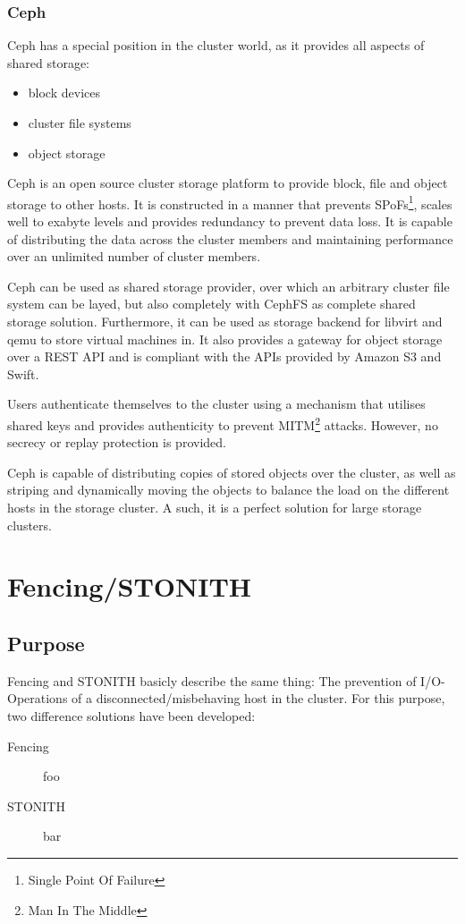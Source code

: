 \subsubsection{Ceph}
Ceph has a special position in the cluster world, as it provides all aspects of shared storage:
\begin{itemize}
\item block devices
\item cluster file systems
\item object storage
\end{itemize}

Ceph is an open source cluster storage platform to provide block, file and object storage to other hosts. It is constructed in a manner that prevents SPoFs\footnote{Single Point Of Failure}, scales well to exabyte levels and provides redundancy to prevent data loss. It is capable of distributing the data across the cluster members and maintaining performance over an unlimited number of cluster members.

Ceph can be used as shared storage provider, over which an arbitrary cluster file system can be layed, but also completely with CephFS as complete shared storage solution. Furthermore, it can be used as storage backend for libvirt and qemu to store virtual machines in. It also provides a gateway for object storage over a REST API and is compliant with the APIs provided by Amazon S3 and Swift.%

Users authenticate themselves to the cluster using a mechanism that utilises shared keys and provides authenticity to prevent MITM\footnote{Man In The Middle} attacks. However, no secrecy or replay protection is provided\cite{ceph_architecture}.

Ceph is capable of distributing copies of stored objects over the cluster, as well as striping and dynamically moving the objects to balance the load on the different hosts in the storage cluster. A such, it is a perfect solution for large storage clusters.

\section{Fencing/STONITH}
\subsection{Purpose}
Fencing and STONITH basicly describe the same thing: The prevention of I/O-Operations of a disconnected/misbehaving host in the cluster. For this purpose, two difference solutions have been developed:
\begin{description}
\item[Fencing] foo
\item[STONITH] bar
\end{description}
